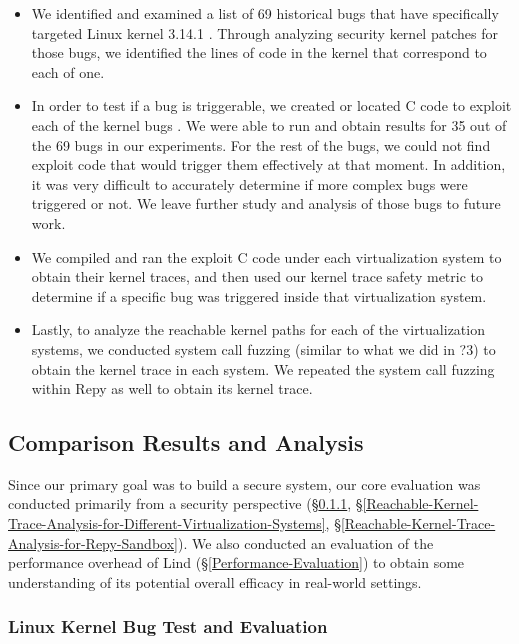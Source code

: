 \begin{itemize}
\item We identified and examined a list of  69 historical bugs that have
specifically 
targeted Linux kernel 3.14.1 \cite{CVE-Datasource}. Through analyzing
security kernel patches for those bugs, 
we identified the lines of code in the kernel that correspond to each of
one.

\item In order to test if a bug is triggerable, we created or located C
code to 
exploit each of the kernel bugs \cite{Exploit-Database}. We were able to
run and obtain results for 
35 out of the 69 bugs in our experiments. For the rest of the bugs, 
we could not find exploit code that would trigger them effectively at that
moment. 
In addition, it was very difficult to accurately determine if more complex
bugs 
were triggered or not. We leave further study and analysis of those bugs to
future work.

\item We compiled and ran the exploit C code under each virtualization
system to 
obtain their kernel traces, and then used our kernel trace safety metric to
determine 
if a specific bug was triggered inside that virtualization system. 

\item Lastly, to  analyze the reachable kernel paths for each of the
virtualization systems, 
we conducted system call fuzzing (similar to what we did in ?3) to obtain
the kernel trace in each system. 
We repeated the system call fuzzing within Repy as well to obtain its
kernel trace. 
\end{itemize}

\subsection{Comparison Results and Analysis}

Since our primary goal was to build a secure system, our core evaluation
was conducted primarily 
from a security perspective
(\S{\ref{Linux-Kernel-Bug-Test-and-Evaluation}}, 
\S{\ref{Reachable-Kernel-Trace-Analysis-for-Different-Virtualization-Systems}}, 
\S{\ref{Reachable-Kernel-Trace-Analysis-for-Repy-Sandbox}}). 
We also conducted an evaluation of the performance overhead of Lind
(\S{\ref{Performance-Evaluation}}) 
to obtain some understanding of its potential overall efficacy in
real-world settings.

\subsubsection{Linux Kernel Bug Test and Evaluation}
\label{Linux-Kernel-Bug-Test-and-Evaluation}

